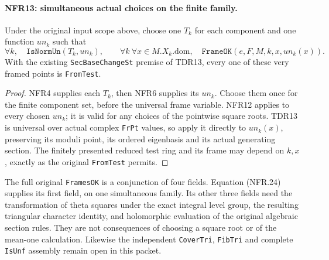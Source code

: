 \paragraph{NFR13: simultaneous actual choices on the finite family.}
\label{claim:NFR13}
Under the original input scope above, choose one $T_k$ for each
component and one function $un_k$ such that
\[
  \forall k,\quad\texttt{IsNormUn}(T_k,un_k),\qquad
  \forall k\ \forall x\in M.X_k.\mathrm{dom},\quad
                       \texttt{FrameOK}(e,F,M,k,x,un_k(x)).
 \tag{NFR.24}
\]
With the existing \texttt{SecBaseChangeSt} premise of TDR13,
every one of these very framed points is \texttt{FromTest}.

\begin{proof}
NFR4 supplies each $T_k$, then NFR6 supplies its $un_k$.
Choose them once for the finite component set, before the
universal frame variable.  NFR12 applies to every chosen
$un_k$; it is valid for any choices of the pointwise square roots.
TDR13 is universal over actual complex \texttt{FrPt} values,
so apply it directly to $un_k(x)$, preserving its moduli point,
its ordered eigenbasis and its actual generating section.
The finitely presented reduced test ring and its frame may depend
on $k,x$, exactly as the original \texttt{FromTest} permits.
\end{proof}

The full original \texttt{FramesOK} is a conjunction of four
fields.  Equation (NFR.24) supplies its first field, on one
simultaneous family.  Its other three fields need the
transformation of theta squares under the exact integral
level group, the resulting triangular character identity,
and holomorphic evaluation of the original algebraic section
rules.  They are not consequences of choosing a square root
or of the mean-one calculation.  Likewise the independent
\texttt{CoverTri}, \texttt{FibTri} and complete \texttt{IsUnf}
assembly remain open in this packet.

